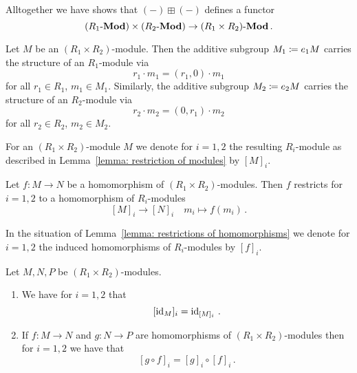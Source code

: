 \begin{remark}
  \label{remark: functor out of product}
  Alltogether we have shows that $(-) \boxplus (-)$ defines a functor
  \[
        (R_1\text{-}\mathbf{Mod}) \times (R_2\text{-}\mathbf{Mod})
    \to (R_1 \times R_2)\text{-}\mathbf{Mod} \,.
  \]
\end{remark}


\begin{lemma}
  \label{lemma: restriction of modules}
  Let $M$ be an $(R_1 \times R_2)$-module.
  Then the additive subgroup $M_1 \coloneqq e_1 M$ carries the structure of an $R_1$-module via
  \[
      r_1 \cdot m_1
    = (r_1, 0) \cdot m_1
  \]
  for all $r_1 \in R_1$, $m_1 \in M_1$.
  Similarly, the additive subgroup $M_2 \coloneqq e_2 M$ carries the structure of an $R_2$-module via
  \[
      r_2 \cdot m_2
    = (0, r_1) \cdot m_2
  \]
  for all $r_2 \in R_2$, $m_2 \in M_2$.
\end{lemma}


\begin{definition}
  For an $(R_1 \times R_2)$-module $M$ we denote for $i = 1, 2$ the resulting $R_i$-module as described in Lemma~\ref{lemma: restriction of modules} by $[M]_i$.
\end{definition}


\begin{lemma}
  \label{lemma: restrictions of homomorphisms}
  Let $f \colon M \to N$ be a homomorphism of $(R_1 \times R_2)$-modules.
  Then $f$ restricts for $i = 1, 2$ to a homomorphism of $R_i$-modules
  \[
            [M]_i
    \to     [N]_i
    \quad   m_i
    \mapsto f(m_i) \,.
  \]
\end{lemma}


\begin{definition}
  In the situation of Lemma~\ref{lemma: restrictions of homomorphisms} we denote for $i = 1, 2$ the induced homomorphisms of $R_i$-modules by $[f]_i$.
\end{definition}


\begin{lemma}
  Let $M, N, P$ be $(R_1 \times R_2)$-modules.
  \begin{enumerate}
    \item
      We have for $i = 1, 2$ that
      \[
          [\operatorname{id}_M]_i
        = \operatorname{id}_{[M]_i} \,.
      \]
    \item
      If $f \colon M \to N$ and $g \colon N \to P$ are homomorphisms of $(R_1 \times R_2)$-modules then for $i = 1, 2$ we have that
      \[
          [g \circ f]_i
        = [g]_i \circ [f]_i \,.
      \]
  \end{enumerate}
\end{lemma}



